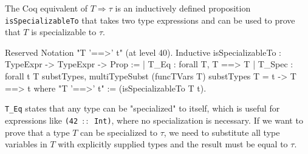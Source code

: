 \documentclass[paper = a4, fleqn, abstract=on, twoside]{scrreprt}
\newcommand{\coqinline}[1]{\texttt{#1}}
\begin{document}
\par
The Coq equivalent of $T \Rightarrow \tau$ is an inductively defined proposition \coqinline{isSpecializableTo} that takes two type expressions and can be used to prove that $T$ is specializable to $\tau$.
\begin{coqcode}
Reserved Notation "T '==>' t" (at level 40).
Inductive isSpecializableTo : TypeExpr -> TypeExpr -> Prop :=
  | T_Eq   : forall T, T  ==> T
  | T_Spec : forall t T substTypes,
               multiTypeSubst (funcTVars T) substTypes T = t ->
               T ==> t
where "T '==>' t" := (isSpecializableTo T t).
\end{coqcode}
\coqinline{T_Eq} states that any type can be "specialized" to itself, which is useful for expressions like \texttt{(42 $::$ Int)}, where no specialization is necessary. If we want to prove that a type $T$ can be specialized to $\tau$, we need to substitute all type variables in $T$ with explicitly supplied types and the result must be equal to $\tau$.
\end{document}
